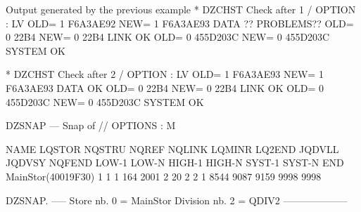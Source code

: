 \begin{landscapebody}
\begin{XMPt}{Output generated by the previous example}
* DZCHST Check after 1       / OPTION : LV    OLD=   1         F6A3AE92    NEW=   1         F6A3AE93        DATA    ?? PROBLEMS??
                                              OLD=   0             22B4    NEW=   0             22B4        LINK       OK        
                                              OLD=   0         455D203C    NEW=   0         455D203C        SYSTEM     OK        
                                                                                                                                 
* DZCHST Check after 2       / OPTION : LV    OLD=   1         F6A3AE93    NEW=   1         F6A3AE93        DATA       OK        
                                              OLD=   0             22B4    NEW=   0             22B4        LINK       OK        
                                              OLD=   0         455D203C    NEW=   0         455D203C        SYSTEM     OK        
                                                                                                                                 
DZSNAP --- Snap of //                                                                              OPTIONS : M                   
                                                                                                                                 
  NAME       LQSTOR NQSTRU  NQREF NQLINK LQMINR LQ2END JQDVLL JQDVSY NQFEND  LOW-1  LOW-N HIGH-1 HIGH-N SYST-1 SYST-N    END     
 MainStor(40019F30)      1      1      1    164   2001      2     20      2      2      1   8544   9087   9159   9998   9998     
                                                                                                                                 
DZSNAP.   -----  Store nb. 0 = MainStor Division nb. 2 = QDIV2                       --------------------                        
                                                                                                                                 

\end{XMPt}
\end{landscapebody}
